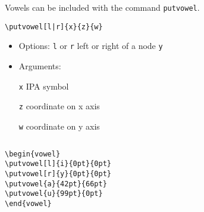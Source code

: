 \begin{frame}[fragile]

Vowels can be included with the command \lstinline|putvowel|.

\begin{lstlisting}
\putvowel[l|r]{x}{z}{w}
\end{lstlisting}

\begin{itemize}
\item Options:  \lstinline|l| or \lstinline|r| \ras left or right of a node \lstinline|y|

\item Arguments: 

\lstinline|x| \ras IPA symbol

\lstinline|z| \ras coordinate on x axis

\lstinline|w| \ras coordinate on y axis
\end{itemize}


\begin{columns}

\begin{column}{.65\textwidth}
{\footnotesize
\begin{lstlisting}
\begin{vowel}
\putvowel[l]{i}{0pt}{0pt}
\putvowel[r]{y}{0pt}{0pt}
\putvowel{a}{42pt}{66pt}
\putvowel{u}{99pt}{0pt}
\end{vowel}
\end{lstlisting}
}

\end{column}
\begin{column}{.35\textwidth}

\begin{vowel}
\end{vowel}

\end{column}

\end{columns}

\end{frame}


